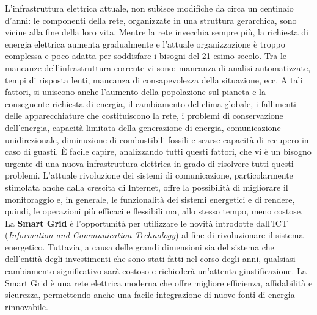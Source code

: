 L'infrastruttura elettrica attuale, non subisce modifiche da circa un centinaio d'anni: le componenti della rete, organizzate in una struttura gerarchica, sono vicine alla fine della loro vita. \newline Mentre la rete invecchia sempre più, la richiesta di energia elettrica aumenta gradualmente e l'attuale organizzazione è troppo complessa e poco adatta per soddisfare i bisogni del 21-esimo secolo. \newline Tra le mancanze dell'infrastruttura corrente vi sono: mancanza di analisi automatizzate, tempi di risposta lenti, mancanza di consapevolezza della situazione, ecc. A tali fattori, si uniscono anche l'aumento della popolazione sul pianeta e la conseguente richiesta di energia, il cambiamento del clima globale, i fallimenti delle apparecchiature che costituiscono la rete, i problemi di conservazione dell'energia, capacità limitata della generazione di energia, comunicazione unidirezionale, diminuzione di combustibili fossili e scarse capacità di recupero in caso di guasti. \newline È facile capire, analizzando tutti questi fattori, che vi è un bisogno urgente di una nuova infrastruttura elettrica in grado di risolvere tutti questi problemi. \newline \newline
L'attuale rivoluzione dei sistemi di comunicazione, particolarmente stimolata anche dalla crescita di Internet, offre la possibilità di migliorare il monitoraggio e, in generale, le funzionalità dei sistemi energetici e di rendere, quindi, le operazioni più efficaci e flessibili ma, allo stesso tempo, meno costose. \newline
La \textbf{Smart Grid} è l'opportunità per utilizzare le novità introdotte dall'ICT   (\textit{Information and Communication Technology}) al fine di rivoluzionare il sistema energetico. Tuttavia, a causa delle grandi dimensioni sia del sistema che dell'entità degli investimenti che sono stati fatti nel corso degli anni, qualsiasi cambiamento significativo sarà costoso e richiederà un'attenta giustificazione. \newline La Smart Grid è una rete elettrica moderna che offre migliore efficienza, affidabilità e sicurezza, permettendo anche una facile integrazione di nuove fonti di energia rinnovabile. \newline \newline
